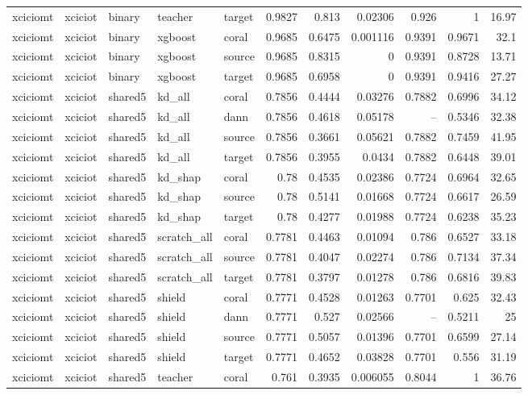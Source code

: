 \begin{table}
\begin{tabular}{lllllrrrrrr}
xciciomt & xciciot & binary & teacher & target & 0.9827 & 0.813 & 0.02306 & 0.926 & 1 & 16.97 \\
xciciomt & xciciot & binary & xgboost & coral & 0.9685 & 0.6475 & 0.001116 & 0.9391 & 0.9671 & 32.1 \\
xciciomt & xciciot & binary & xgboost & source & 0.9685 & 0.8315 & 0 & 0.9391 & 0.8728 & 13.71 \\
xciciomt & xciciot & binary & xgboost & target & 0.9685 & 0.6958 & 0 & 0.9391 & 0.9416 & 27.27 \\
xciciomt & xciciot & shared5 & kd_all & coral & 0.7856 & 0.4444 & 0.03276 & 0.7882 & 0.6996 & 34.12 \\
xciciomt & xciciot & shared5 & kd_all & dann & 0.7856 & 0.4618 & 0.05178 & -- & 0.5346 & 32.38 \\
xciciomt & xciciot & shared5 & kd_all & source & 0.7856 & 0.3661 & 0.05621 & 0.7882 & 0.7459 & 41.95 \\
xciciomt & xciciot & shared5 & kd_all & target & 0.7856 & 0.3955 & 0.0434 & 0.7882 & 0.6448 & 39.01 \\
xciciomt & xciciot & shared5 & kd_shap & coral & 0.78 & 0.4535 & 0.02386 & 0.7724 & 0.6964 & 32.65 \\
xciciomt & xciciot & shared5 & kd_shap & source & 0.78 & 0.5141 & 0.01668 & 0.7724 & 0.6617 & 26.59 \\
xciciomt & xciciot & shared5 & kd_shap & target & 0.78 & 0.4277 & 0.01988 & 0.7724 & 0.6238 & 35.23 \\
xciciomt & xciciot & shared5 & scratch_all & coral & 0.7781 & 0.4463 & 0.01094 & 0.786 & 0.6527 & 33.18 \\
xciciomt & xciciot & shared5 & scratch_all & source & 0.7781 & 0.4047 & 0.02274 & 0.786 & 0.7134 & 37.34 \\
xciciomt & xciciot & shared5 & scratch_all & target & 0.7781 & 0.3797 & 0.01278 & 0.786 & 0.6816 & 39.83 \\
xciciomt & xciciot & shared5 & shield & coral & 0.7771 & 0.4528 & 0.01263 & 0.7701 & 0.625 & 32.43 \\
xciciomt & xciciot & shared5 & shield & dann & 0.7771 & 0.527 & 0.02566 & -- & 0.5211 & 25 \\
xciciomt & xciciot & shared5 & shield & source & 0.7771 & 0.5057 & 0.01396 & 0.7701 & 0.6599 & 27.14 \\
xciciomt & xciciot & shared5 & shield & target & 0.7771 & 0.4652 & 0.03828 & 0.7701 & 0.556 & 31.19 \\
xciciomt & xciciot & shared5 & teacher & coral & 0.761 & 0.3935 & 0.006055 & 0.8044 & 1 & 36.76 \\

\end{tabular}
\end{table}
